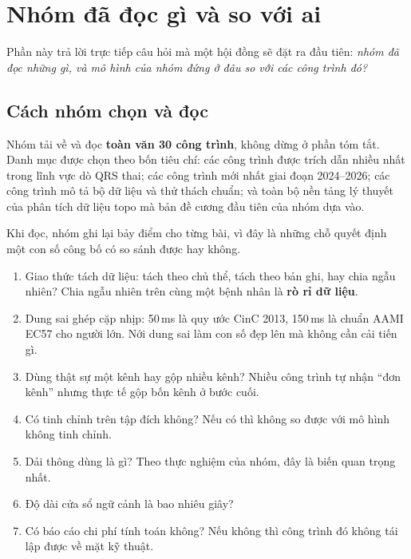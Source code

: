 \section{Nhóm đã đọc gì và so với ai}
\label{sec:yvan}

Phần này trả lời trực tiếp câu hỏi mà một hội đồng sẽ đặt ra đầu tiên: \textit{nhóm đã đọc những gì,
và mô hình của nhóm đứng ở đâu so với các công trình đó?}

\subsection{Cách nhóm chọn và đọc}

Nhóm tải về và đọc \textbf{toàn văn 30 công trình}, không dừng ở phần tóm tắt. Danh mục được chọn theo
bốn tiêu chí: các công trình được trích dẫn nhiều nhất trong lĩnh vực dò QRS thai; các công trình mới
nhất giai đoạn 2024--2026; các công trình mô tả bộ dữ liệu và thử thách chuẩn; và toàn bộ nền tảng lý
thuyết của phân tích dữ liệu topo mà bản đề cương đầu tiên của nhóm dựa vào.

Khi đọc, nhóm ghi lại bảy điểm cho từng bài, vì đây là những chỗ quyết định một con số công bố có so
sánh được hay không.

\begin{enumerate}[leftmargin=1.6em,itemsep=2pt]
\item Giao thức tách dữ liệu: tách theo chủ thể, tách theo bản ghi, hay chia ngẫu nhiên?
Chia ngẫu nhiên trên cùng một bệnh nhân là \textbf{rò rỉ dữ liệu}.
\item Dung sai ghép cặp nhịp: 50\,ms là quy ước CinC 2013, 150\,ms là chuẩn AAMI EC57 cho người lớn.
Nới dung sai làm con số đẹp lên mà không cần cải tiến gì.
\item Dùng thật sự một kênh hay gộp nhiều kênh? Nhiều công trình tự nhận ``đơn kênh'' nhưng thực tế
gộp bốn kênh ở bước cuối.
\item Có tinh chỉnh trên tập đích không? Nếu có thì không so được với mô hình không tinh chỉnh.
\item Dải thông dùng là gì? Theo thực nghiệm của nhóm, đây là biến quan trọng nhất.
\item Độ dài cửa sổ ngữ cảnh là bao nhiêu giây?
\item Có báo cáo chi phí tính toán không? Nếu không thì công trình đó không tái lập được về mặt kỹ thuật.
\end{enumerate}

